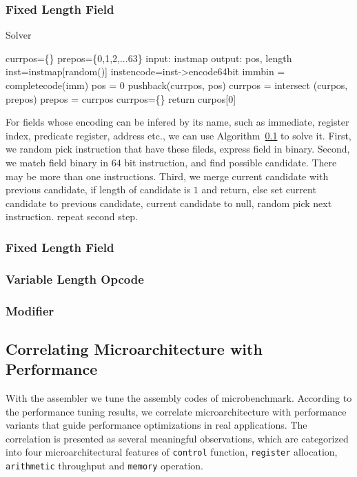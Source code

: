 \documentclass{sig-alternate-05-2015}
\begin{document}
\subsubsection{Fixed Length Field}

\begin{algorithm}
      \caption{Solver}\label{integer_solver}
  \begin{algorithmic}[1]
      \State currpos=\{\}
      \State prepos=\{0,1,2,...63\}
      \State input: instmap
      \State output: pos, length
      \State inst=instmap[random()]
      \State instencode=inst->encode64bit
      \State immbin = completecode(imm)
      \State pos = 0
      \State pushback(currpos, pos)
      \EndIf
      \EndWhile
      \State currpos = intersect (curpos, prepos)
      \State prepos = currpos
      \State currpos=\{\}
      \EndIf
      \EndWhile
      \State return curpos[0]
  \end{algorithmic}
\end{algorithm}

For fields whose encoding can be infered by its name, such as immediate, register index, predicate register, address etc., we can use Algorithm~\ref{} to solve it.
First, we random pick instruction that have these fileds, express field in binary. Second, we match field binary in $64$
bit instruction, and find possible candidate. There may be more than one instructions. Third, we merge current candidate
with previous candidate, if length of candidate is $1$ and return, else set current candidate to previous candidate, current candidate to null, random pick next instruction. repeat second step.


\subsubsection{Fixed Length Field}
\subsubsection{Variable Length Opcode}
\subsubsection{Modifier}

\subsection{Correlating Microarchitecture with Performance}
With the assembler we tune the assembly codes of microbenchmark. According to the performance tuning results, we correlate microarchitecture with performance variants that guide performance optimizations in real applications. The correlation is presented as several meaningful observations, which are categorized into four microarchitectural features of {\tt control} function, {\tt register} allocation, {\tt arithmetic} throughput and {\tt memory} operation.
\end{document}
